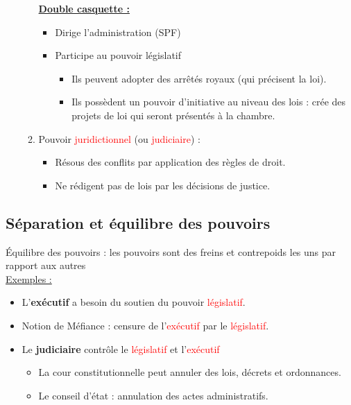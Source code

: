 \begin{itemize}
\begin{enumerate}
        \underline{\textbf{Double casquette :}}
        \begin{itemize}
            \item Dirige l'administration (SPF)
            \item Participe au pouvoir législatif
            \begin{itemize}
                \item Ils peuvent adopter des arrêtés royaux (qui précisent la loi).
                \item Ils possèdent un pouvoir d'initiative au niveau des lois : crée des projets de loi qui seront présentés à la chambre.
            \end{itemize}
        \end{itemize}
        \item Pouvoir \textcolor{red}{juridictionnel} (ou \textcolor{red}{judiciaire}) :
        \begin{itemize}
            \item Résous des conflits par application des règles de droit.
            \item Ne rédigent pas de lois par les décisions de justice.
        \end{itemize}
    \end{enumerate}
\end{itemize}

\subsection{Séparation et équilibre des pouvoirs}

Équilibre des pouvoirs : les pouvoirs sont des freins et contrepoids les uns par rapport aux autres\\

\underline{Exemples :}
\begin{itemize}
    \item L'\textbf{exécutif} a besoin du soutien du pouvoir \textcolor{red}{législatif}.
    \item Notion de Méfiance : censure de l'\textcolor{red}{exécutif} par le \textcolor{red}{législatif}.
    \item Le \textbf{judiciaire} contrôle le \textcolor{red}{législatif} et l'\textcolor{red}{exécutif}
    \begin{itemize}
        \item La cour constitutionnelle peut annuler des lois, décrets et ordonnances.
        \item Le conseil d'état : annulation des actes administratifs.
    \end{itemize}
\end{itemize}

